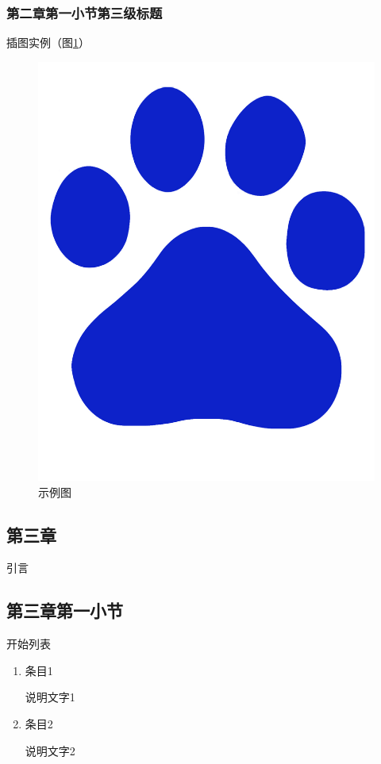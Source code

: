\documentclass[twoside]{CUGThesis}
\begin{document}
	\subsubsection{第二章第一小节第三级标题}
	插图实例（图\ref{Fig:example}）
	\begin{figure}[!t]
		\centering
		\includegraphics[scale=0.5]{Figures/example.jpg}
		\caption{示例图}
		\label{Fig:example}
	\end{figure}
	
	
	
	\begin{spacing}{2}
		\section{第三章}
	\end{spacing}
	引言
	\subsection{第三章第一小节}
	开始列表
	\begin{enumerate}
		\item 条目1
		
		说明文字1
		
		\item 条目2
		
		说明文字2
		
		
	\end{enumerate}
\end{document}
